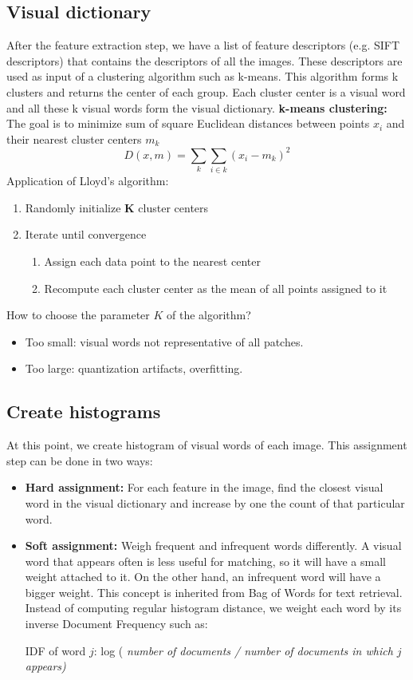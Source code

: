 \subsection{Visual dictionary}
After the feature extraction step, we have a list of feature descriptors (e.g. SIFT descriptors) that contains the descriptors of all the images. These descriptors are used as input of a clustering algorithm such as k-means. This algorithm forms k clusters and returns the center of each group. Each cluster center is a visual word and all these k visual words form the visual dictionary.\newline\newline
\textbf{k-means clustering:} The goal is to minimize sum of square Euclidean distances between points $x_{i}$ and their nearest cluster centers $m_{k}$
\[D(x,m) = \sum_{k}\sum_{i \in k}(x_{i} - m_{k})^{2}\]
Application of Lloyd's algorithm:
\begin{enumerate}
    \item Randomly initialize $\textbf{K}$ cluster centers
    \item Iterate until convergence
    \begin{enumerate}
        \item Assign each data point to the nearest center
        \item Recompute each cluster center as the mean of all points assigned to it
    \end{enumerate}
\end{enumerate}
How to choose the parameter $K$ of the algorithm?
\begin{itemize}
    \item Too small: visual words not representative of all patches.
    \item Too large: quantization artifacts, overfitting.
\end{itemize}
\subsection{Create histograms}
At this point, we create histogram of visual words of each image. This assignment step can be done in two ways:
\begin{itemize}
    \item \textbf{Hard assignment:} For each feature in the image, find the closest visual word in the visual dictionary and increase by one the count of that particular word.
    \item \textbf{Soft assignment:} Weigh frequent and infrequent words differently. A visual word that appears often is less useful for matching, so it will have a small weight attached to it. On the other hand, an infrequent word will have a bigger weight.\newline\newline
    This concept is inherited from Bag of Words for text retrieval. Instead of computing regular histogram distance, we weight each word by its inverse Document Frequency such as:
    \begin{center}
        IDF of word $j$: log ( \textit{number of documents / number of documents in which $j$ appears)}
    \end{center}    
\end{itemize}
